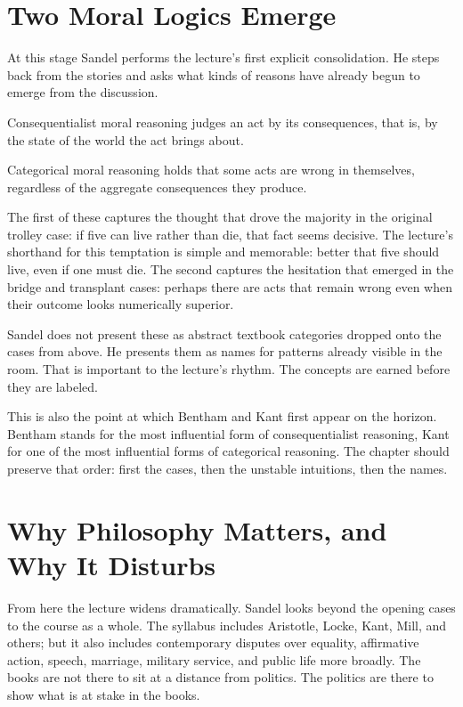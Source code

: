 \section{Two Moral Logics Emerge}

At this stage Sandel performs the lecture's first explicit consolidation. He steps back from the stories and asks what kinds of reasons have already begun to emerge from the discussion.

\begin{definition}
Consequentialist moral reasoning judges an act by its consequences, that is, by the state of the world the act brings about.
\end{definition}

\begin{definition}
Categorical moral reasoning holds that some acts are wrong in themselves, regardless of the aggregate consequences they produce.
\end{definition}

The first of these captures the thought that drove the majority in the original trolley case: if five can live rather than die, that fact seems decisive. The lecture's shorthand for this temptation is simple and memorable: better that five should live, even if one must die. The second captures the hesitation that emerged in the bridge and transplant cases: perhaps there are acts that remain wrong even when their outcome looks numerically superior.

Sandel does not present these as abstract textbook categories dropped onto the cases from above. He presents them as names for patterns already visible in the room. That is important to the lecture's rhythm. The concepts are earned before they are labeled.

This is also the point at which Bentham and Kant first appear on the horizon. Bentham stands for the most influential form of consequentialist reasoning, Kant for one of the most influential forms of categorical reasoning. The chapter should preserve that order: first the cases, then the unstable intuitions, then the names.

\section{Why Philosophy Matters, and Why It Disturbs}

From here the lecture widens dramatically. Sandel looks beyond the opening cases to the course as a whole. The syllabus includes Aristotle, Locke, Kant, Mill, and others; but it also includes contemporary disputes over equality, affirmative action, speech, marriage, military service, and public life more broadly. The books are not there to sit at a distance from politics. The politics are there to show what is at stake in the books.

